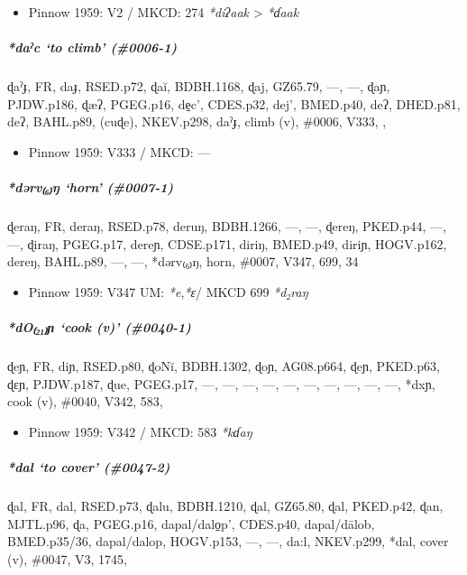 \documentclass[a4paper,]{article}
\providecommand{\tightlist}{%
  \setlength{\itemsep}{0pt}\setlength{\parskip}{0pt}}
\let\oldsubparagraph\subparagraph
\renewcommand{\subparagraph}[1]{\oldsubparagraph{#1}\mbox{}}
\begin{document}
\begin{itemize}
\tightlist
\item
  Pinnow 1959: V2 / MKCD: 274 \emph{*diʔaak} \textgreater{} \emph{*ɗaak}
\end{itemize}

\subparagraph{\texorpdfstring{\emph{*daˀc} `to climb'
(\#0006-1)}{*daˀc to climb (\#0006-1)}}\label{daux2c0c-to-climb-0006-1}

ɖaˀɟ, FR, daɟ, RSED.p72, ɖaĭ, BDBH.1168, ɖaj, GZ65.79, ---, ---, ɖaɲ,
PJDW.p186, ɖæʔ, PGEG.p16, de̠c', CDES.p32, dej', BMED.p40, deʔ, DHED.p81,
deʔ, BAHL.p89, (cuɖe), NKEV.p298, daˀɟ, climb (v), \#0006, V333, ,

\begin{itemize}
\tightlist
\item
  Pinnow 1959: V333 / MKCD: ---
\end{itemize}

\subparagraph{\texorpdfstring{\emph{*dərv₍₆₎ŋ} `horn'
(\#0007-1)}{*dərv₍₆₎ŋ horn (\#0007-1)}}\label{dux259rvux14b-horn-0007-1}

ɖeraŋ, FR, deraŋ, RSED.p78, deruŋ, BDBH.1266, ---, ---, ɖereŋ, PKED.p44,
---, ---, ɖiraŋ, PGEG.p17, dereɲ, CDSE.p171, diriŋ, BMED.p49, diriɲ,
HOGV.p162, dereŋ, BAHL.p89, ---, ---, *dərv₍₆₎ŋ, horn, \#0007, V347,
699, 34

\begin{itemize}
\tightlist
\item
  Pinnow 1959: V347 UM: \emph{*e},\emph{*ɛ}/ MKCD 699 \emph{*d₂raŋ}
\end{itemize}

\subparagraph{\texorpdfstring{\emph{*dO₍₂₁₎ɲ} `cook (v)'
(\#0040-1)}{*dO₍₂₁₎ɲ cook (v) (\#0040-1)}}\label{doux272-cook-v-0040-1}

ɖeɲ, FR, diɲ, RSED.p80, ɖoNĭ, BDBH.1302, ɖoɲ, AG08.p664, ɖeɲ, PKED.p63,
ɖɛɲ, PJDW.p187, ɖue, PGEG.p17, ---, ---, ---, ---, ---, ---, ---, ---,
---, ---, *dxɲ, cook (v), \#0040, V342, 583,

\begin{itemize}
\tightlist
\item
  Pinnow 1959: V342 / MKCD: 583 \emph{*kɗaŋ}
\end{itemize}

\subparagraph{\texorpdfstring{\emph{*dal} `to cover'
(\#0047-2)}{*dal to cover (\#0047-2)}}\label{dal-to-cover-0047-2-1}

ɖal, FR, dal, RSED.p73, ɖalu, BDBH.1210, ɖal, GZ65.80, ɖal, PKED.p42,
ɖan, MJTL.p96, ɖa, PGEG.p16, dapal/dalo̠p', CDES.p40, dapal/dālob,
BMED.p35/36, dapal/dalop, HOGV.p153, ---, ---, da:l, NKEV.p299, *dal,
cover (v), \#0047, V3, 1745,
\end{document}
